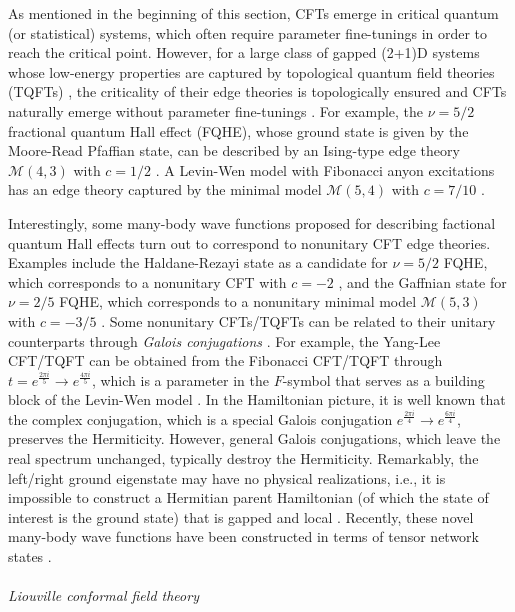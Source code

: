 \documentclass{tADP2e}
\theoremstyle{plain}
\theoremstyle{plain}
\theoremstyle{definition}
\begin{document}
\vspace{3pt}
\noindent
As mentioned in the beginning of this section, CFTs emerge in critical quantum (or statistical) systems, which often require parameter fine-tunings in order to reach the critical point. However, for a large class of gapped (2+1)D systems whose low-energy properties are captured by {topological quantum field theories} (TQFTs) \cite{AMF88}, the criticality of their edge theories is topologically ensured and CFTs naturally emerge without parameter fine-tunings \cite{GM89,EF04}. 
For example, the $\nu=5/2$ fractional quantum Hall effect (FQHE), whose ground state is given by the Moore-Read Pfaffian state, can be described by an Ising-type edge theory $\mathcal{M}(4,3)$ with $c=1/2$ \cite{GM1991}. A Levin-Wen model \cite{LMA05} with Fibonacci anyon excitations has an edge theory captured by the minimal model $\mathcal{M}(5,4)$ with $c=7/10$ \cite{FA2007,CG09,EA11}. 


Interestingly, some  many-body wave functions proposed for describing factional quantum Hall effects turn out to correspond to nonunitary CFT edge theories. Examples include the Haldane-Rezayi state as a candidate for $\nu=5/2$ FQHE, which corresponds to a nonunitary CFT with $c=-2$ \cite{FDMH1988,VG1997}, and the Gaffnian state for $\nu=2/5$ FQHE, which corresponds to a nonunitary minimal model $\mathcal{M}(5,3)$ with $c=-3/5$ \cite{SHS2007}. Some nonunitary CFTs/TQFTs can be related to their unitary counterparts through \emph{Galois conjugations} \cite{EA2011}. 
For example, the Yang-Lee CFT/TQFT can be obtained from the Fibonacci CFT/TQFT through $t=e^{\frac{2\pi i}{5}}\to e^{\frac{4\pi i}{5}}$, which is a parameter in the $F$-symbol that serves as a building block of the Levin-Wen model \cite{LMA05}. In the Hamiltonian picture, it is well known that the complex conjugation, which is a special Galois conjugation $e^{\frac{2\pi i}{4}}\to e^{\frac{6\pi i}{4}}$,  
preserves the Hermiticity. However, general Galois conjugations, which leave the real spectrum unchanged, typically destroy the Hermiticity. 
Remarkably, the left/right ground eigenstate may have {no} physical realizations, i.e., it is impossible to construct a Hermitian parent Hamiltonian (of which the state of interest is the ground state) that is gapped and local \cite{MHF2012}. Recently, these novel many-body wave functions have been constructed in terms of tensor network states \cite{LL20}.
\\ \\ {\it Liouville conformal field theory}
\end{document}
